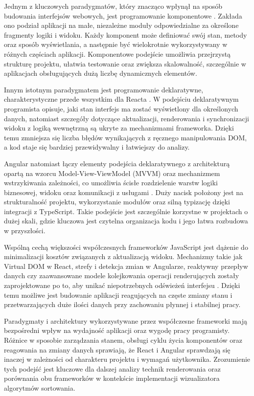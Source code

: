 \documentclass[12pt,openright,twoside]{report}
\begin{document}
Jednym z kluczowych paradygmatów, który znacząco wpłynął na sposób budowania interfejsów webowych, jest programowanie komponentowe \cite{Design_Patterns_JS}. Zakłada ono podział aplikacji na małe, niezależne moduły odpowiedzialne za określone fragmenty logiki i widoku. Każdy komponent może definiować swój stan, metody oraz sposób wyświetlania, a następnie być wielokrotnie wykorzystywany w różnych częściach aplikacji. Komponentowe podejście umożliwia przejrzystą strukturę projektu, ułatwia testowanie oraz zwiększa skalowalność, szczególnie w aplikacjach obsługujących dużą liczbę dynamicznych elementów.

Innym istotnym paradygmatem jest programowanie deklaratywne, charakterystyczne przede wszystkim dla Reacta \cite{Learning_React_Third}. W podejściu deklaratywnym programista opisuje, jaki stan interfejs ma zostać wyświetlony dla określonych danych, natomiast szczegóły dotyczące aktualizacji, renderowania i synchronizacji widoku z logiką wewnętrzną są ukryte za mechanizmami frameworka. Dzięki temu zmniejsza się liczba błędów wynikających z ręcznego manipulowania DOM, a kod staje się bardziej przewidywalny i łatwiejszy do analizy.

Angular natomiast łączy elementy podejścia deklaratywnego z architekturą opartą na wzorcu Model-View-ViewModel (MVVM) oraz mechanizmem wstrzykiwania zależności, co umożliwia ścisłe rozdzielenie warstw logiki biznesowej, widoku oraz komunikacji z usługami \cite{Angular_Development}. Duży nacisk położony jest na strukturalność projektu, wykorzystanie modułów oraz silną typizację dzięki integracji z TypeScript. Takie podejście jest szczególnie korzystne w projektach o dużej skali, gdzie kluczowa jest czytelna organizacja kodu i jego łatwa rozbudowa w przyszłości.

Wspólną cechą większości współczesnych frameworków JavaScript jest dążenie do minimalizacji kosztów związanych z aktualizacją widoku. Mechanizmy takie jak Virtual DOM w React, strefy i detekcja zmian w Angularze, reaktywny przepływ danych czy zaawansowane modele kolejkowania operacji renderujących zostały zaprojektowane po to, aby unikać niepotrzebnych odświeżeń interfejsu \cite{VDOM_Efficiency}. Dzięki temu możliwe jest budowanie aplikacji reagujących na częste zmiany stanu i przetwarzających duże ilości danych przy zachowaniu płynnej i stabilnej pracy.

Paradygmaty i architektury wykorzystywane przez współczesne frameworki mają bezpośredni wpływ na wydajność aplikacji oraz wygodę pracy programisty. Różnice w sposobie zarządzania stanem, obsługi cyklu życia komponentów oraz reagowania na zmiany danych sprawiają, że React i Angular sprawdzają się inaczej w zależności od charakteru projektu i wymagań użytkownika. Zrozumienie tych podejść jest kluczowe dla dalszej analizy technik renderowania oraz porównania obu frameworków w kontekście implementacji wizualizatora algorytmów \mbox{sortowania}.
\end{document}
